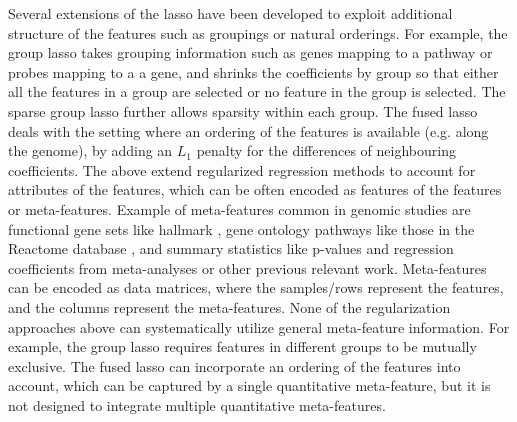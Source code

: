 Several extensions of the lasso have been developed to exploit additional structure of the features such as groupings or natural orderings. For example, the group lasso \citep{yuan2006model} takes grouping information such as genes mapping to a pathway or probes mapping to a a gene, and shrinks the coefficients by group so that either all the features in a group are selected or no feature in the group is selected. The sparse group lasso \citep{simon2013sparse} further allows sparsity within each group. The fused lasso deals with the setting where an ordering of the features is available (e.g. along the genome), by adding an $L_1$ penalty for the differences of neighbouring coefficients. The above extend regularized  regression methods to account for attributes of the features, which can be often encoded as features of the features or meta-features. Example of meta-features common in genomic studies are functional gene sets like hallmark \citep{liberzon2015molecular}, gene ontology pathways like those in the Reactome database \citep{jassal2020reactome}, and summary statistics like p-values and regression coefficients from meta-analyses or other previous relevant work. Meta-features can be encoded as data matrices, where the samples/rows represent the features, and the columns represent the meta-features. None of the regularization approaches above can systematically utilize general meta-feature information. For example, the group lasso requires features in different groups to be mutually exclusive. The fused lasso can incorporate an ordering of the features into account, which can be captured by a single quantitative meta-feature, but it is not designed to integrate multiple quantitative meta-features. 

